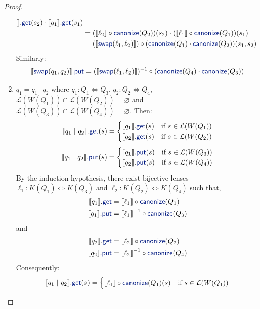 \documentclass[acmsmall,review,anonymous]{acmart}
\newcommand{\kw}[1]{\textcolor{dkblue}{\ensuremath{\mathsf{#1}}}}
\newcommand{\sep}{\ensuremath{\ | \ }}
\newcommand{\canonize}{\ensuremath{\kw{canonize}}}
\newcommand{\get}{\ensuremath{\kw{get}}}
\newcommand{\lput}{\ensuremath{\kw{put}}}
\newcommand{\swap}{\ensuremath{\kw{swap}}}
\begin{document}
\begin{proof}
\begin{enumerate}
\begin{align*}
\rrbracket.\get(s_2) \cdot \llbracket q_1 \rrbracket.\get(s_1)\\
&= (\llbracket \ell_2 \rrbracket \circ
\canonize(Q_2))(s_2) \cdot  (\llbracket \ell_1 \rrbracket \circ
\canonize(Q_1))(s_1)\\
&= (\llbracket \swap(\ell_1, \ell_2) \rrbracket) \circ (\canonize(Q_1) \cdot
\canonize(Q_2)) (s_1, s_2)
\end{align*}
Similarly:
$$
\llbracket \swap(q_1, q_2) \rrbracket.\lput = (\llbracket \swap(\ell_1, \ell_2)
\rrbracket)^{-1} \circ (\canonize(Q_4) \cdot \canonize(Q_3))$$
\item
$q_1 = q_1 \sep q_2$ where $q_1 : Q_1 \Leftrightarrow Q_3 $, $q_2 : Q_2
\Leftrightarrow Q_4$, $\mathcal{L}(W(Q_1)) \cap \mathcal{L}(W(Q_2)) =
\varnothing$ and $\mathcal{L}(W(Q_3)) \cap \mathcal{L}(W(Q_4)) = \varnothing$.
Then:$$
\llbracket q_1 \sep q_2 \rrbracket.\get(s) =
\begin{cases}
\llbracket q_1 \rrbracket.\get (s) & \text{if } s \in \mathcal{L}(W(Q_1))\\
\llbracket q_2 \rrbracket.\get (s) & \text{if } s \in \mathcal{L}(W(Q_2))\\
\end{cases}$$
$$\llbracket q_1 \sep q_2 \rrbracket.\lput(s) =
\begin{cases}
\llbracket q_1 \rrbracket.\lput (s) & \text{if } s \in \mathcal{L}(W(Q_3))\\
\llbracket q_2 \rrbracket.\lput (s) & \text{if } s \in \mathcal{L}(W(Q_4))\\
\end{cases}
$$
By the induction hypothesis, there exist bijective lenses $\ell_1 : K(Q_1)
\Leftrightarrow K(Q_3)$ and $\ell_2 : K(Q_2) \Leftrightarrow K(Q_4)$ such that,
\begin{align*}
\llbracket q_1 \rrbracket.\get &= \llbracket \ell_1 \rrbracket \circ
\canonize(Q_1)\\
\llbracket q_1 \rrbracket.\lput &= {\llbracket \ell_1 \rrbracket}^{-1} \circ
\canonize(Q_3)
\end{align*}
and
\begin{align*}
\llbracket q_2 \rrbracket.\get &= \llbracket \ell_2 \rrbracket \circ
\canonize(Q_2)\\
\llbracket q_2 \rrbracket.\lput &= {\llbracket \ell_2 \rrbracket}^{-1} \circ
\canonize(Q_4)
\end{align*}
Consequently:
$$
\llbracket q_1 \sep q_2 \rrbracket.\get(s) =
\begin{cases}
\llbracket \ell_1 \rrbracket \circ
\canonize(Q_1) (s) & \text{if } s \in \mathcal{L}(W(Q_1))\\

\end{cases}$$
\end{enumerate}
\end{proof}
\end{document}

